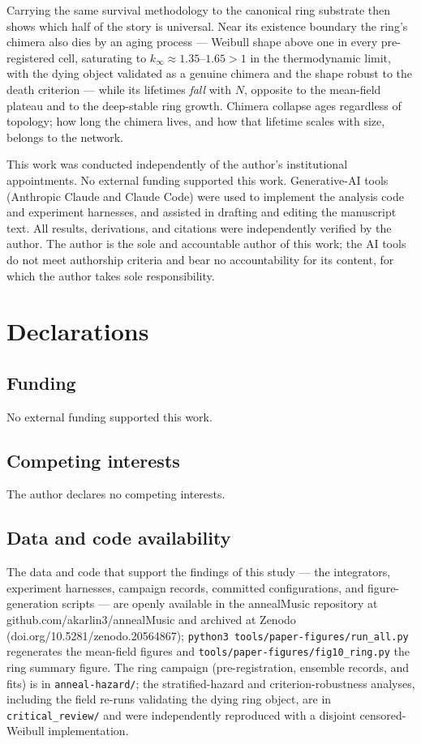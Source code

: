 \documentclass[pdflatex,sn-mathphys,Numbered]{sn-jnl}
\begin{document}
Carrying the same survival methodology to the canonical ring substrate then shows
which half of the story is universal. Near its existence boundary the ring's
chimera also dies by an aging process --- Weibull shape above one in every
pre-registered cell, saturating to $k_\infty \approx 1.35$--$1.65 > 1$ in the
thermodynamic limit, with the dying object validated as a genuine chimera and the
shape robust to the death criterion --- while its lifetimes \emph{fall} with $N$,
opposite to the mean-field plateau and to the deep-stable ring growth. Chimera
collapse ages regardless of topology; how long the chimera lives, and how that
lifetime scales with size, belongs to the network.

\backmatter

This work was conducted independently of the author's institutional appointments.
No external funding supported this work. Generative-AI tools (Anthropic Claude and
Claude Code) were used to implement the analysis code and experiment harnesses, and
assisted in drafting and editing the manuscript text. All results, derivations, and
citations were independently verified by the author. The author is the sole and
accountable author of this work; the AI tools do not meet authorship criteria and
bear no accountability for its content, for which the author takes sole
responsibility.

\section*{Declarations}

\subsection*{Funding}
No external funding supported this work.

\subsection*{Competing interests}
The author declares no competing interests.

\subsection*{Data and code availability}
The data and code that support the findings of this study --- the integrators,
experiment harnesses, campaign records, committed configurations, and
figure-generation scripts --- are openly available in the annealMusic repository at
github.com/akarlin3/annealMusic and archived at Zenodo
(doi.org/10.5281/zenodo.20564867); \texttt{python3 tools/paper-figures/run\_all.py}
regenerates the mean-field figures and
\texttt{tools/paper-figures/fig10\_ring.py} the ring summary figure. The ring
campaign (pre-registration, ensemble records, and fits) is in
\texttt{anneal-hazard/}; the stratified-hazard and criterion-robustness analyses,
including the field re-runs validating the dying ring object, are in
\texttt{critical\_review/} and were independently reproduced with a disjoint
censored-Weibull implementation.
\end{document}
